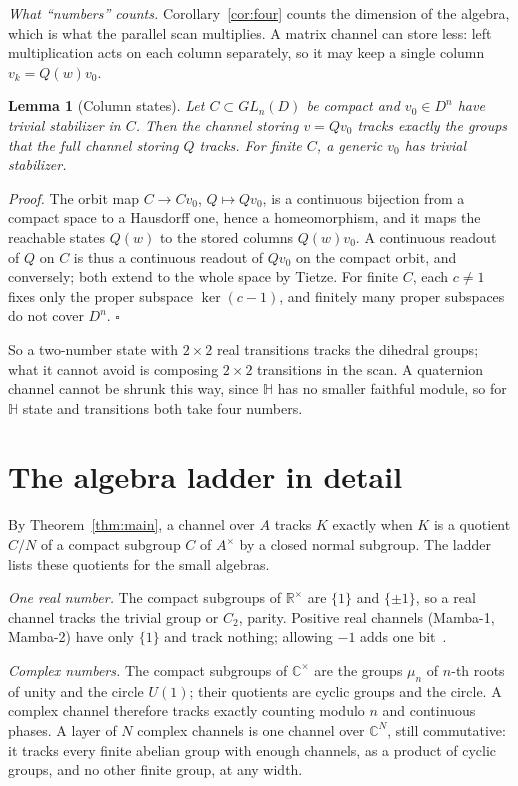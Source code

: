 \documentclass[aps,prx,reprint,superscriptaddress,longbibliography,nofootinbib,floatfix]{revtex4-2}
\newcommand{\HH}{\mathbb{H}}
\newcommand{\CC}{\mathbb{C}}
\newcommand{\RR}{\mathbb{R}}
\theoremstyle{plain}
\newtheorem{lemma}{Lemma}
\theoremstyle{definition}
\begin{document}
\emph{What ``numbers'' counts.} Corollary~\ref{cor:four} counts the
dimension of the algebra, which is what the parallel scan multiplies. A
matrix channel can store less: left multiplication acts on each column
separately, so it may keep a single column $v_k=Q(w)v_0$.

\begin{lemma}[Column states]\label{lem:column}
Let $C\subset GL_n(D)$ be compact and $v_0\in D^n$ have trivial stabilizer in
$C$. Then the channel storing $v=Qv_0$ tracks exactly the groups that the
full channel storing $Q$ tracks. For finite $C$, a generic $v_0$ has trivial
stabilizer.
\end{lemma}
\emph{Proof.} The orbit map $C\to Cv_0$, $Q\mapsto Qv_0$, is a continuous
bijection from a compact space to a Hausdorff one, hence a homeomorphism,
and it maps the reachable states $Q(w)$ to the stored columns $Q(w)v_0$. A continuous readout of $Q$
on $C$ is thus a continuous readout of $Qv_0$ on the compact orbit, and
conversely; both extend to the whole space by Tietze. For finite $C$, each
$c\ne1$ fixes only the proper subspace $\ker(c-1)$, and finitely many proper
subspaces do not cover $D^n$. $\square$

So a two-number state with $2\times2$ real transitions tracks the dihedral
groups; what it cannot avoid is composing $2\times2$ transitions in the
scan. A quaternion channel cannot be shrunk this way, since $\HH$ has no
smaller faithful module, so for $\HH$ state and transitions both take four
numbers.

\section{The algebra ladder in detail}\label{sm:ladder}

By Theorem~\ref{thm:main}, a channel over $A$ tracks $K$ exactly when $K$
is a quotient $C/N$ of a compact subgroup $C$ of $A^\times$ by a closed
normal subgroup. The ladder lists these quotients for the small algebras.

\emph{One real number.} The compact subgroups of $\RR^\times$ are $\{1\}$
and $\{\pm1\}$, so a real channel tracks the trivial group or $C_2$, parity.
Positive real channels (Mamba-1, Mamba-2) have only $\{1\}$ and track
nothing; allowing $-1$ adds one bit~\cite{grazzi}.

\emph{Complex numbers.} The compact subgroups of $\CC^\times$ are the groups
$\mu_n$ of $n$-th roots of unity and the circle $U(1)$; their quotients are
cyclic groups and the circle. A complex channel therefore tracks exactly
counting modulo $n$ and continuous phases. A layer of $N$ complex channels
is one channel over $\CC^N$, still commutative: it tracks every finite
abelian group with enough channels, as a product of cyclic groups, and no
other finite group, at any width.
\end{document}

